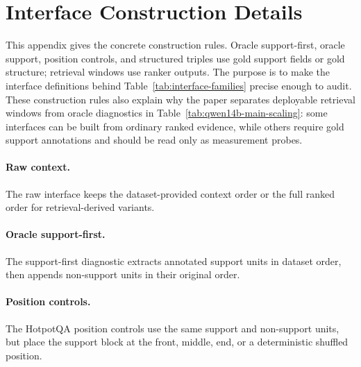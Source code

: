 \documentclass[a4paper,fleqn]{cas-sc}
\begin{document}
\clearpage



\clearpage
\appendix
\renewcommand{\arraystretch}{0.88}
\setcounter{table}{0}
\setcounter{figure}{0}
\setcounter{equation}{0}
\makeatletter
{}
\makeatother
\renewcommand{\thetable}{\Alph{section}.\arabic{table}}
\renewcommand{\thefigure}{\Alph{section}.\arabic{figure}}
\renewcommand{\theequation}{\Alph{section}.\arabic{equation}}

\section{Interface Construction Details}
\label{app:interface-construction}

This appendix gives the concrete construction rules. Oracle support-first,
oracle support, position controls, and structured triples use gold support
fields or gold structure; retrieval windows use ranker outputs.
The purpose is to make the interface definitions behind
Table~\ref{tab:interface-families} precise enough to audit. These construction
rules also explain why the paper separates deployable retrieval windows from
oracle diagnostics in Table~\ref{tab:qwen14b-main-scaling}: some interfaces can
be built from ordinary ranked evidence, while others require gold support
annotations and should be read only as measurement probes.

\paragraph{Raw context.}
The raw interface keeps the dataset-provided context order or the full ranked
order for retrieval-derived variants.

\paragraph{Oracle support-first.}
The support-first diagnostic extracts annotated support units in dataset order,
then appends non-support units in their original order.

\paragraph{Position controls.}
The HotpotQA position controls use the same support and non-support units, but
place the support block at the front, middle, end, or a deterministic shuffled
position.
\end{document}
